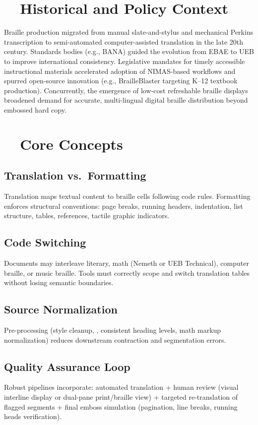 \section{~~Historical and Policy Context}
\label{sec:braille-history}
Braille production migrated from manual slate-and-stylus and mechanical Perkins transcription to semi-automated computer-assisted translation in the late 20th century. Standards bodies (e.g., BANA) guided the evolution from EBAE to UEB to improve international consistency. Legislative mandates for timely accessible instructional materials accelerated adoption of NIMAS-based workflows and spurred open-source innovation (e.g., BrailleBlaster targeting K–12 textbook production). Concurrently, the emergence of low-cost refreshable braille displays broadened demand for accurate, multi-lingual digital braille distribution beyond embossed hard copy.

\section{~~Core Concepts}
\label{sec:braille-core-concepts}
\subsection*{Translation vs.\ Formatting}
Translation maps textual content to braille cells following code rules. Formatting enforces structural conventions: page breaks, running headers, indentation, list structure, tables, references, tactile graphic indicators.

\subsection*{Code Switching}
Documents may interleave literary, math (Nemeth or UEB Technical), computer braille, or music braille. Tools must correctly scope and switch translation tables without losing semantic boundaries.

\subsection*{Source Normalization}
Pre-processing (style cleanup, , consistent heading levels, math markup normalization) reduces downstream contraction and segmentation errors.

\subsection*{Quality Assurance Loop}
Robust pipelines incorporate: automated translation + human review (visual interline display or dual-pane print/braille view) + targeted re-translation of flagged segments + final emboss simulation (pagination, line breaks, running heads verification).

